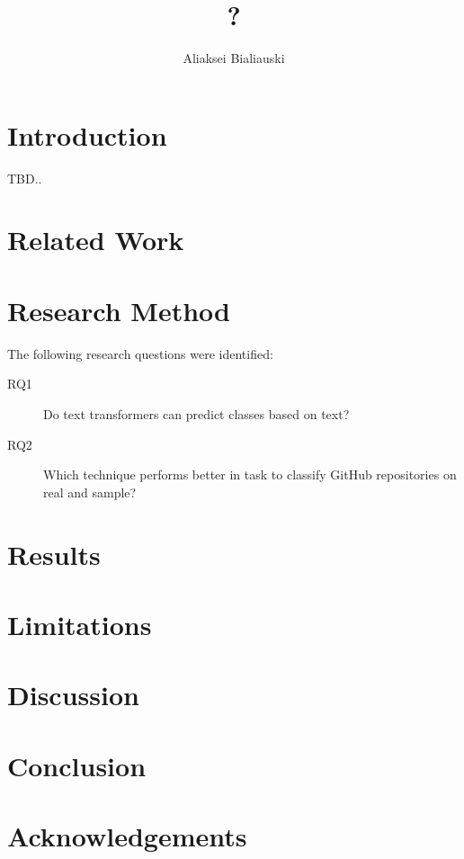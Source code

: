 \documentclass[sigplan,nonacm,review]{acmart}
\title{?}
\author{Aliaksei Bialiauski}
\affiliation{
    \institution{?}
    \city{Minsk}
    \country{Belarus}
}
\begin{document}
    \maketitle


    \section{Introduction}\label{sec:introduction}
    TBD..


    \section{Related Work}\label{sec:related}


    \section{Research Method}\label{sec:method}
    The following research questions were identified:
    \begin{description}
        \item[RQ1] Do text transformers can predict classes based on text?
        \item[RQ2] Which technique performs better in task to classify GitHub repositories on real and sample?
    \end{description}


    \section{Results}\label{sec:results}


    \section{Limitations}\label{sec:limitations}


    \section{Discussion}\label{sec:discussion}


    \section{Conclusion}\label{sec:conclusion}


    \section{Acknowledgements}\label{sec:acks}

    
    \cite{testCitation}
    
\end{document}
